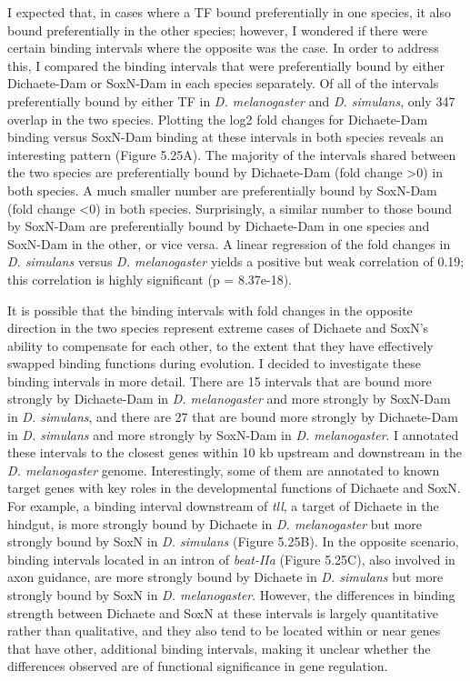 I expected that, in cases where a TF bound preferentially in one species, it also bound preferentially in the other species; however, I wondered if there were certain binding intervals where the opposite was the case. In order to address this, I compared the binding intervals that were preferentially bound by either Dichaete-Dam or SoxN-Dam in each species separately. Of all of the intervals preferentially bound by either TF in \emph{D. melanogaster} and \emph{D. simulans}, only 347 overlap in the two species. Plotting the log2 fold changes for Dichaete-Dam binding versus SoxN-Dam binding at these intervals in both species reveals an interesting pattern (Figure 5.25A). The majority of the intervals shared between the two species are preferentially bound by Dichaete-Dam (fold change \textgreater 0) in both species. A much smaller number are preferentially bound by SoxN-Dam (fold change \textless 0) in both species. Surprisingly, a similar number to those bound by SoxN-Dam are preferentially bound by Dichaete-Dam in one species and SoxN-Dam in the other, or vice versa. A linear regression of the fold changes in \emph{D. simulans} versus \emph{D. melanogaster} yields a positive but weak correlation of 0.19; this correlation is highly significant (p = 8.37e-18).

It is possible that the binding intervals with fold changes in the opposite direction in the two species represent extreme cases of Dichaete and SoxN's ability to compensate for each other, to the extent that they have effectively swapped binding functions during evolution. I decided to investigate these binding intervals in more detail. There are 15 intervals that are bound more strongly by Dichaete-Dam in \emph{D. melanogaster} and more strongly by SoxN-Dam in \emph{D. simulans}, and there are 27 that are bound more strongly by Dichaete-Dam in \emph{D. simulans} and more strongly by SoxN-Dam in \emph{D. melanogaster}. I annotated these intervals to the closest genes within 10 kb upstream and downstream in the \emph{D. melanogaster} genome. Interestingly, some of them are annotated to known target genes with key roles in the developmental functions of Dichaete and SoxN. For example, a binding interval downstream of \emph{tll}, a target of Dichaete in the hindgut, is more strongly bound by Dichaete in \emph{D. melanogaster} but more strongly bound by SoxN in \emph{D. simulans} (Figure 5.25B). In the opposite scenario, binding intervals located in an intron of \emph{beat-IIa} (Figure 5.25C), also involved in axon guidance, are more strongly bound by Dichaete in \emph{D. simulans} but more strongly bound by SoxN in \emph{D. melanogaster}. However, the differences in binding strength between Dichaete and SoxN at these intervals is largely quantitative rather than qualitative, and they also tend to be located within or near genes that have other, additional binding intervals, making it unclear whether the differences observed are of functional significance in gene regulation.

